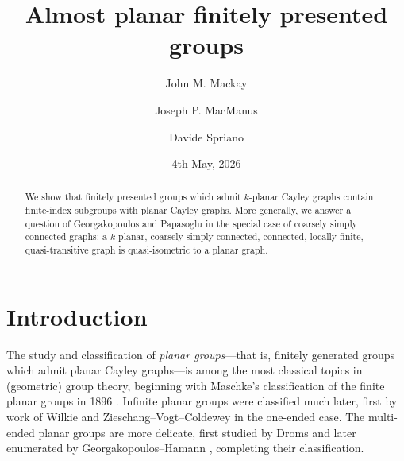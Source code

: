 \documentclass[11pt,a4paper]{amsart}
\title{Almost planar finitely presented groups}
\author{John M. Mackay}
\author{Joseph P. MacManus}
\author{Davide Spriano}
\date{4th May, 2026}%
\theoremstyle{definition}
\begin{document}
\begin{abstract}
    We show that finitely presented groups which admit $k$-planar Cayley graphs contain finite-index subgroups with planar Cayley graphs.
	More generally, we answer a question of Georgakopoulos and Papasoglu in the special case of coarsely simply connected graphs: a $k$-planar, coarsely simply connected, connected, locally finite, quasi-transitive graph is quasi-isometric to a planar graph.
    

\end{abstract}

\maketitle








\section{Introduction}

The study and classification of \textit{planar groups}---that is, finitely generated groups which admit planar Cayley graphs---is among the most classical topics in (geometric) group theory, beginning with Maschke's classification of the finite planar groups in 1896 \cite{maschke1896representation}. Infinite planar groups were classified much later, first by work of Wilkie \cite{wilkie1966non} and Zieschang--Vogt--Coldewey \cite{zieschang1970flachen} in the one-ended case. The multi-ended planar groups are more delicate, first studied by Droms \cite{droms2006infinite} and later enumerated by Georgakopoulos--Hamann \cite{georgakopoulos2019planari, georgakopoulos2023planar}, completing their classification.
\end{document}
